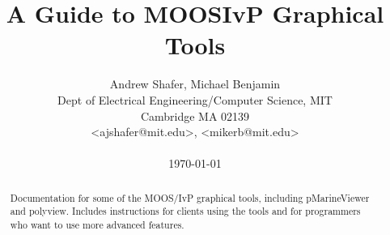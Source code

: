 \documentclass[conference]{IEEEtran}
\newcommand{\email}[1]{\textless #1\textgreater}
\begin{document}
\title{A Guide to MOOSIvP Graphical Tools}
\author{Andrew Shafer, Michael Benjamin \\
Dept of Electrical Engineering/Computer Science, MIT \\
Cambridge MA 02139 \\
\email{ajshafer@mit.edu}, \email{mikerb@mit.edu} \\ \\
{\Large{\today}}}
\maketitle


\begin{abstract}
Documentation for some of the MOOS/IvP graphical tools, including pMarineViewer and polyview.  Includes instructions for clients using the tools and for programmers who want to use more advanced features.
\end{abstract}







\cite{ac90}

\small
 



\newpage
\appendices

%
%
\end{document}
